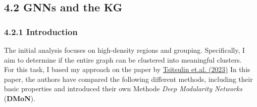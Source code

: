 \subsection{4.2 GNNs and the KG}\label{gnns-and-the-kg}

\subsubsection{4.2.1 Introduction}\label{introduction-2}

The initial analysis focuses on high-density regions and grouping.
Specifically, I aim to determine if the entire graph can be clustered
into meaningful clusters. For this task, I based my approach on the
paper by
\href{https://www.jmlr.org/papers/volume24/20-998/20-998.pdf}{Tsitsulin
et.al. (2023)} In this paper, the authors have compared the following
different methods, including their basic properties and introduced their
own Methode \emph{Deep Modularity Networks} (\textbf{DMoN}).

